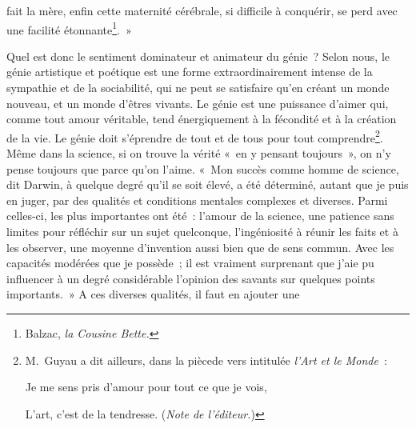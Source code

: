 \documentclass[french,twoside]{book} %
\begin{document}
fait la mère, enfin cette maternité cérébrale, si difficile à conquérir, se perd avec une facilité étonnante\footnote{ Balzac, \emph{la Cousine Bette.}}. »\par
Quel est donc le sentiment dominateur et animateur du génie ? Selon nous, le génie artistique et poétique est une forme extraordinairement intense de la sympathie et de la sociabilité, qui ne peut se satisfaire qu’en créant un monde nouveau, et un monde d’êtres vivants. Le génie est une puissance d’aimer qui, comme tout amour véritable, tend énergiquement à la fécondité et à la création de la vie. Le génie doit s’éprendre de tout et de tous pour tout comprendre\footnote{\noindent M. Guyau a dit ailleurs, dans la piècede vers intitulée \emph{l’Art et le Monde} :\par
\noindent Je me sens pris d’amour pour tout ce que je vois,\par
L’art, c’est de la tendresse. (\emph{Note de l’éditeur.})
}. Même dans la science, si on trouve la vérité « en y pensant toujours », on n’y pense toujours que parce qu’on l’aime. « Mon succès comme homme de science, dit Darwin, à quelque degré qu’il se soit élevé, a été déterminé, autant que je puis en juger, par des qualités et conditions mentales complexes et diverses. Parmi celles-ci, les plus importantes ont été : l’amour de la science, une patience sans limites pour réfléchir sur un sujet quelconque, l’ingéniosité à réunir les faits et à les observer, une moyenne d’invention aussi bien que de sens commun. Avec les capacités modérées que je possède ; il est vraiment surprenant que j’aie pu influencer à un degré considérable l’opinion des savants sur quelques points importants. » A ces diverses qualités, il faut en ajouter une\par
\end{document}
